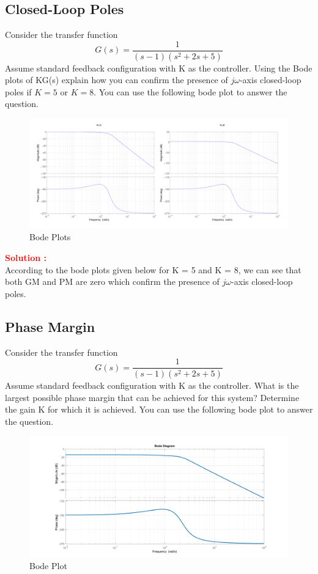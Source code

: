 \documentclass[12pt]{article}
\begin{document}
\subsection{Closed-Loop Poles}  
Consider the transfer function 
\[
G(s)=\frac{1}{(s - 1)(s^2 + 2s + 5)}
\]
Assume standard feedback configuration with K as the controller. Using the Bode plots of KG(s) explain how you can confirm the
presence of $j\omega$-axis closed-loop poles if $K=5$ or $K=8$. You can use the following bode plot to answer the question. \\

\begin{figure}[H]
    \centering
    \includegraphics[width=1\linewidth]{figs/6.14.png}
    \caption{Bode Plots}
    \label{fig:prb30}
\end{figure}


\textbf{\textcolor{red}{Solution :}} \\
According to the bode plots given below for K = 5 and K = 8, we can see that both GM and PM are zero which confirm the presence of $j\omega$-axis closed-loop poles.
\clearpage

\subsection{Phase Margin}

Consider the transfer function 
\[
G(s)=\frac{1}{(s - 1)(s^2 + 2s + 5)}
\]
Assume standard feedback configuration with K as the controller. What is the largest possible phase margin that can be achieved for this system? Determine the gain K for which it is achieved. You can use the following bode plot to answer the question.\\

\begin{figure}[H]
    \centering
    \includegraphics[width=1\linewidth]{figs/6.15.jpg}
    \caption{Bode Plot}
    \label{fig:prb31}
\end{figure}
\end{document}
